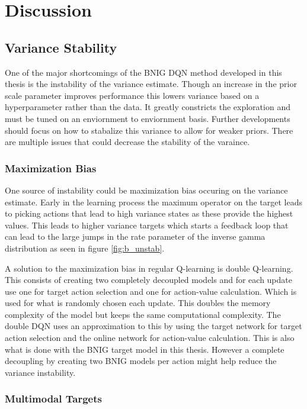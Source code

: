 \chapter{Discussion}\label{ch:disc}


\section{Variance Stability}

One of the major shortcomings of the BNIG DQN method developed in this thesis is the instability of the variance estimate. Though an increase in the prior scale parameter improves performance this lowers variance based on a hyperparameter rather than the data. It greatly constricts the exploration and must be tuned on an enviornment to enviornment basis. Further developments should focus on how to stabalize this variance to allow for weaker priors. There are multiple issues that could decrease the stability of the varaince.

\subsection{Maximization Bias}

One source of instability could be maximization bias\citep[p.~134]{sutton_barto_2018} occuring on the variance estimate. Early in the learning process the maximum operator on the target leads to picking actions that lead to high variance states as these provide the highest values. This leads to higher variance targets which starts a feedback loop that can lead to the large jumps in the rate parameter of the inverse gamma distribution as seen in figure \ref{fig:b_unstab}.

A solution to the maximization bias in regular Q-learning is double Q-learning\citep[p.~134]{sutton_barto_2018}. This consists of creating two completely decoupled models and for each update use one for target action selection and one for action-value calculation. Which is used for what is randomly chosen each update. This doubles the memory complexity of the model but keeps the same computational complexity. The double DQN uses an approximation to this by using the target network for target action selection and the online network for action-value calculation. This is also what is done with the BNIG target model in this thesis. However a complete decoupling by creating two BNIG models per action might help reduce the variance instability.

\subsection{Multimodal Targets}

